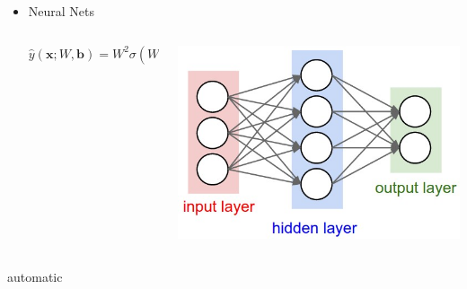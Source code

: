 \documentclass{beamer}
\begin{document}
\begin{frame}
\begin{itemize}
				\vspace{-0.1cm}
				\item Neural Nets
					 \begin{columns}[onlytextwidth]
								 	\begin{column}{0.75\textwidth}
								 		\centering
								 		
										{\small$$
										\hat{y}(\bm{x}; W, \bm{b}) = W^2\sigma(W^1\bm{x} + \bm{b}^1 ) + \bm{b}^2
										$$}
										\vspace{0.1cm}
				
								 	\end{column}
								 	\begin{column}{0.25\textwidth}
								 		\includegraphics[scale=0.14]{img/two_layer_nn}	 	
								 	\end{column}
					 \end{columns}
				

			\end{itemize}
			
			\vspace{-0.3cm}
			\begin{tcolorbox}[colback=gray!0, colframe=red!90]
				 automatic
			\end{tcolorbox}
	\end{frame}
\end{document}
